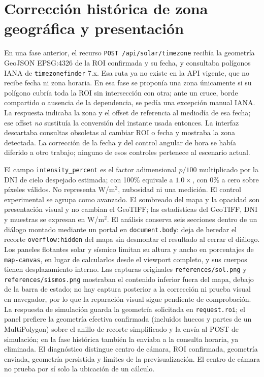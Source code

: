 \documentclass[11pt,a4paper]{article}
\begin{document}
\section{Corrección histórica de zona geográfica y presentación}
En una fase anterior, el recurso \texttt{POST /api/solar/timezone} recibía la geometría GeoJSON EPSG:4326 de la ROI confirmada y su fecha, y consultaba polígonos IANA de \texttt{timezonefinder} 7.x. Esa ruta ya no existe en la API vigente, que no recibe fecha ni zona horaria. En esa fase se proponía una zona únicamente si su polígono cubría toda la ROI sin intersección con otra; ante un cruce, borde compartido o ausencia de la dependencia, se pedía una excepción manual IANA. La respuesta indicaba la zona y el offset de referencia al mediodía de esa fecha; ese offset \emph{no} sustituía la conversión del instante usada entonces. La interfaz descartaba consultas obsoletas al cambiar ROI o fecha y mostraba la zona detectada. La corrección de la fecha y del control angular de hora se había diferido a otro trabajo; ninguno de esos controles pertenece al escenario actual.

El campo \texttt{intensity\_percent} es el factor adimensional $p/100$ multiplicado por la DNI de cielo despejado estimada; con 100\% equivale a $1.0\times$, con 0\% a cero sobre píxeles válidos. No representa W/m$^2$, nubosidad ni una medición. El control experimental se agrupa como avanzado. El sombreado del mapa y la opacidad son presentación visual y no cambian el GeoTIFF; las estadísticas del GeoTIFF, DNI y muestras se expresan en W/m$^2$. El análisis conserva seis secciones dentro de un diálogo montado mediante un portal en \texttt{document.body}: deja de heredar el recorte \texttt{overflow:hidden} del mapa sin desmontar el resultado al cerrar el diálogo. Los paneles flotantes solar y sísmico limitan su altura y ancho en porcentajes de \texttt{map-canvas}, en lugar de calcularlos desde el viewport completo, y sus cuerpos tienen desplazamiento interno. Las capturas originales \texttt{references/sol.png} y \texttt{references/sismos.png} mostraban el contenido inferior fuera del mapa, debajo de la barra de estado; no hay captura posterior a la corrección ni prueba visual en navegador, por lo que la reparación visual sigue pendiente de comprobación. La respuesta de simulación guarda la geometría solicitada en \texttt{request.roi}; el panel prefiere la geometría efectiva confirmada (incluidos huecos y partes de un MultiPolygon) sobre el anillo de recorte simplificado y la envía al POST de simulación; en la fase histórica también la enviaba a la consulta horaria, ya eliminada. El diagnóstico distingue centro de cámara, ROI confirmada, geometría enviada, geometría persistida y límites de la previsualización. El centro de cámara no prueba por sí solo la ubicación de un cálculo.
\end{document}
